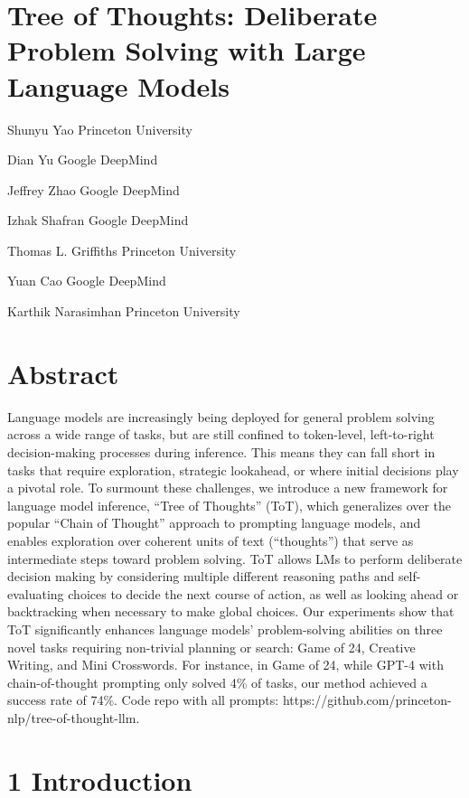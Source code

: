 \documentclass[
]{article}
\author{}
\date{}
\begin{document}
\section{Tree of Thoughts: Deliberate Problem Solving with Large
Language
Models}\label{tree-of-thoughts-deliberate-problem-solving-with-large-language-models}

Shunyu Yao Princeton University

Dian Yu Google DeepMind

Jeffrey Zhao Google DeepMind

Izhak Shafran Google DeepMind

Thomas L. Griffiths Princeton University

Yuan Cao Google DeepMind

Karthik Narasimhan Princeton University

\section{Abstract}\label{abstract}

Language models are increasingly being deployed for general problem
solving across a wide range of tasks, but are still confined to
token-level, left-to-right decision-making processes during inference.
This means they can fall short in tasks that require exploration,
strategic lookahead, or where initial decisions play a pivotal role. To
surmount these challenges, we introduce a new framework for language
model inference, ``Tree of Thoughts'' (ToT), which generalizes over the
popular ``Chain of Thought'' approach to prompting language models, and
enables exploration over coherent units of text (``thoughts'') that
serve as intermediate steps toward problem solving. ToT allows LMs to
perform deliberate decision making by considering multiple different
reasoning paths and self-evaluating choices to decide the next course of
action, as well as looking ahead or backtracking when necessary to make
global choices. Our experiments show that ToT significantly enhances
language models' problem-solving abilities on three novel tasks
requiring non-trivial planning or search: Game of 24, Creative Writing,
and Mini Crosswords. For instance, in Game of 24, while GPT-4 with
chain-of-thought prompting only solved 4\% of tasks, our method achieved
a success rate of 74\%. Code repo with all prompts:
https://github.com/princeton-nlp/tree-of-thought-llm.

\section{1 Introduction}\label{introduction}
\end{document}
